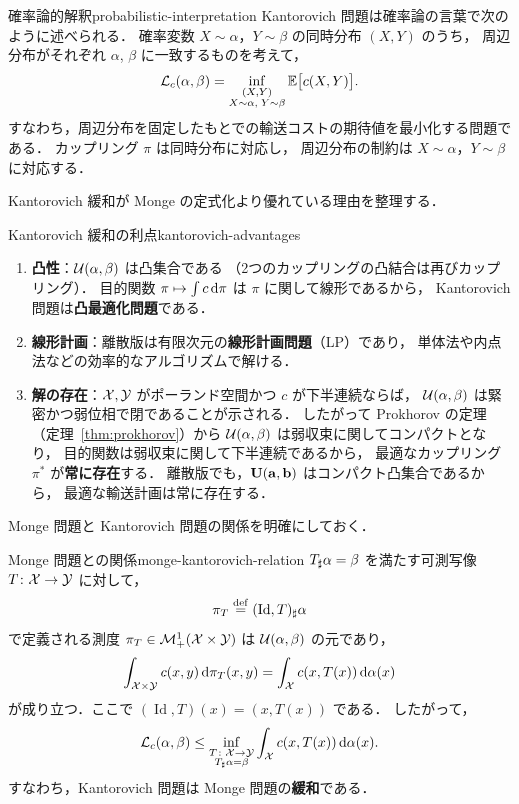 \begin{remark}{確率論的解釈}{probabilistic-interpretation}
  Kantorovich 問題は確率論の言葉で次のように述べられる．
  確率変数 $X \sim \alpha$，$Y \sim \beta$ の同時分布 $(X, Y)$ のうち，
  周辺分布がそれぞれ $\alpha$, $\beta$ に一致するものを考えて，
  \[
    \mathcal{L}_c(\alpha, \beta) = \inf_{\substack{(X, Y) \\ X \sim \alpha,\; Y \sim \beta}}
    \mathbb{E}\bigl[c(X, Y)\bigr].
  \]
  すなわち，周辺分布を固定したもとでの輸送コストの期待値を最小化する問題である．
  カップリング $\pi$ は同時分布に対応し，
  周辺分布の制約は $X \sim \alpha$，$Y \sim \beta$ に対応する．
\end{remark}

Kantorovich 緩和が Monge の定式化より優れている理由を整理する．

\begin{remark}{Kantorovich 緩和の利点}{kantorovich-advantages}
  \begin{enumerate}
    \item \textbf{凸性}：$\mathcal{U}(\alpha, \beta)$ は凸集合である
      （2つのカップリングの凸結合は再びカップリング）．
      目的関数 $\pi \mapsto \int c \, \mathrm{d}\pi$ は $\pi$ に関して線形であるから，
      Kantorovich 問題は\textbf{凸最適化問題}である．
    \item \textbf{線形計画}：離散版は有限次元の\textbf{線形計画問題}（LP）であり，
      単体法や内点法などの効率的なアルゴリズムで解ける．
    \item \textbf{解の存在}：$\mathcal{X}, \mathcal{Y}$ がポーランド空間かつ $c$ が下半連続ならば，
      $\mathcal{U}(\alpha, \beta)$ は緊密かつ弱位相で閉であることが示される．
      したがって Prokhorov の定理（定理~\ref{thm:prokhorov}）から
      $\mathcal{U}(\alpha, \beta)$ は弱収束に関してコンパクトとなり，
      目的関数は弱収束に関して下半連続であるから，
      最適なカップリング $\pi^*$ が\textbf{常に存在}する．
      離散版でも，$\mathbf{U}(\mathbf{a}, \mathbf{b})$ はコンパクト凸集合であるから，
      最適な輸送計画は常に存在する．
  \end{enumerate}
\end{remark}

Monge 問題と Kantorovich 問題の関係を明確にしておく．

\begin{proposition}{Monge 問題との関係}{monge-kantorovich-relation}
  $T_\sharp \alpha = \beta$ を満たす可測写像 $T \colon \mathcal{X} \to \mathcal{Y}$ に対して，
  \[
    \pi_T \overset{\mathrm{def}}{=} (\operatorname{Id}, T)_\sharp \alpha
  \]
  で定義される測度 $\pi_T \in \mathcal{M}_+^1(\mathcal{X} \times \mathcal{Y})$ は
  $\mathcal{U}(\alpha, \beta)$ の元であり，
  \[
    \int_{\mathcal{X} \times \mathcal{Y}} c(x, y) \, \mathrm{d}\pi_T(x, y)
    = \int_{\mathcal{X}} c(x, T(x)) \, \mathrm{d}\alpha(x)
  \]
  が成り立つ．ここで $(\operatorname{Id}, T)(x) = (x, T(x))$ である．
  したがって，
  \[
    \mathcal{L}_c(\alpha, \beta) \leq
    \inf_{\substack{T \colon \mathcal{X} \to \mathcal{Y} \\ T_\sharp \alpha = \beta}}
    \int_{\mathcal{X}} c(x, T(x)) \, \mathrm{d}\alpha(x).
  \]
  すなわち，Kantorovich 問題は Monge 問題の\textbf{緩和}である．
\end{proposition}

